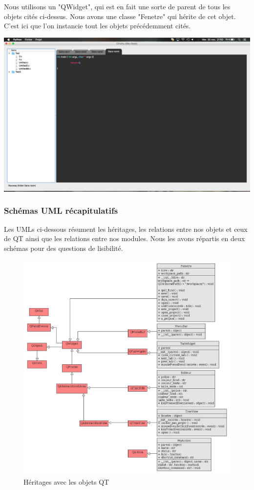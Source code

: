 \documentclass[a4paper,12pt]{article}
\begin{document}
				Nous utilisons un "QWidget", qui est en fait une sorte de parent de tous les objets cités ci-dessus. Nous avons une classe "Fenetre" qui hérite de cet objet. C'est ici que l'on instancie tout les objets précédemment cités.\\
			\begin{center}
				\includegraphics[scale=0.2]{images/QWidget}
				\vspace{0.6cm}
			\end{center}
			
		\subsubsection*{Schémas UML récapitulatifs}
		
			Les UMLs ci-dessous résument les héritages, les relations entre nos objets et ceux de QT ainsi que les relations entre nos modules. Nous les avons répartis en deux schémas pour des questions de lisibilité.
			
			\begin{figure}[h!]
				\includegraphics[scale=0.45]{images/uml_module_gui_heritage}
				\caption{Héritages avec les objets QT}
			\end{figure}
			
\end{document}
